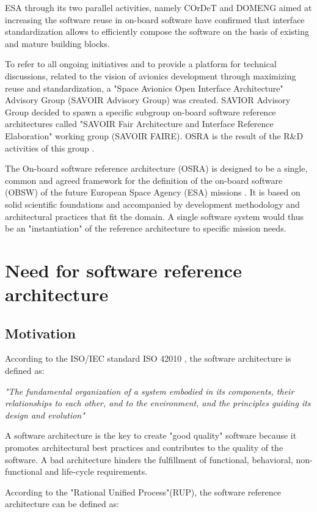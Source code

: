 ESA through its two parallel activities, namely COrDeT and DOMENG \cite{CORDET} aimed at increasing the software reuse in on-board software have confirmed that interface standardization allows to efficiently compose the software on the basis of existing and mature building blocks.

To refer to all ongoing initiatives and to provide a platform for technical discussions, related to the vision of avionics development through maximizing reuse and standardization, a "Space Avionics Open Interface Architecture" Advisory Group (SAVOIR Advisory Group) was created. SAVIOR Advisory Group decided to spawn a specific subgroup on-board software reference architectures called "SAVOIR Fair Architecture and Interface Reference Elaboration" working group (SAVOIR FAIRE). OSRA is the result of the R\&D activities of this group \cite{SAVOIR}.   

The On-board software reference architecture (OSRA) is designed to be a single, common and agreed framework for the definition of the on-board software (OBSW) of the future European Space Agency (ESA) missions \cite{SAVOIR}. It is based on solid scientific foundations and accompanied by development methodology and architectural practices that fit the domain. A single software system would thus be an "instantiation" of the reference architecture to specific mission needs.

\section{Need for software reference architecture}
\subsection{Motivation}
According to the ISO/IEC standard ISO 42010 \cite{ISO42010}, the software architecture is defined as: 

\textit{"The fundamental organization of a system embodied in its components, their relationships
to each other, and to the environment, and the principles guiding its design and evolution"}
 
A software architecture is the key to create "good quality" software because it promotes architectural best practices and contributes to the quality of the software. A bad architecture hinders the fulfillment of functional, behavioral, non-functional and life-cycle requirements.

According to the "Rational Unified Process"(RUP)\cite{RUP}, the software reference architecture can be defined as:

